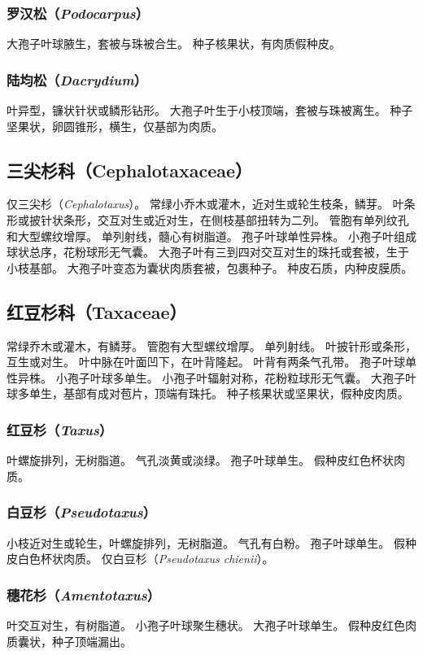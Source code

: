 \documentclass[11pt]{article}
\begin{document}
\begin{sloppypar}
\subsubsection{罗汉松（\textit{Podocarpus}）}
大孢子叶球腋生，套被与珠被合生。
种子核果状，有肉质假种皮。

\subsubsection{陆均松（\textit{Dacrydium}）}
叶异型，镰状针状或鳞形钻形。
大孢子叶生于小枝顶端，套被与珠被离生。
种子坚果状，卵圆锥形，横生，仅基部为肉质。

\subsection{三尖杉科（Cephalotaxaceae）}
仅三尖杉（\textit{Cephalotaxus}）。
常绿小乔木或灌木，近对生或轮生枝条，鳞芽。
叶条形或披针状条形，交互对生或近对生，在侧枝基部扭转为二列。
管胞有单列纹孔和大型螺纹增厚。
单列射线，髓心有树脂道。
孢子叶球单性异株。
小孢子叶组成球状总序，花粉球形无气囊。
大孢子叶有三到四对交互对生的珠托或套被，生于小枝基部。
大孢子叶变态为囊状肉质套被，包裹种子。
种皮石质，内种皮膜质。

\subsection{红豆杉科（Taxaceae）}
常绿乔木或灌木，有鳞芽。
管胞有大型螺纹增厚。
单列射线。
叶披针形或条形，互生或对生。
叶中脉在叶面凹下，在叶背隆起。
叶背有两条气孔带。
孢子叶球单性异株。
小孢子叶球多单生。
小孢子叶辐射对称，花粉粒球形无气囊。
大孢子叶球多单生，基部有成对苞片，顶端有珠托。
种子核果状或坚果状，假种皮肉质。

\subsubsection{红豆杉（\textit{Taxus}）}
叶螺旋排列，无树脂道。
气孔淡黄或淡绿。
孢子叶球单生。
假种皮红色杯状肉质。

\subsubsection{白豆杉（\textit{Pseudotaxus}）}
小枝近对生或轮生，叶螺旋排列，无树脂道。
气孔有白粉。
孢子叶球单生。
假种皮白色杯状肉质。
仅白豆杉（\textit{Pseudotaxus chienii}）。

\subsubsection{穗花杉（\textit{Amentotaxus}）}
叶交互对生，有树脂道。
小孢子叶球聚生穗状。
大孢子叶球单生。
假种皮红色肉质囊状，种子顶端漏出。


\end{sloppypar}
\end{document}

